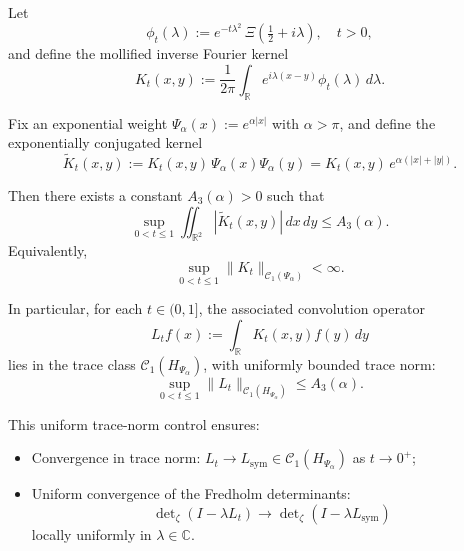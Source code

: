 \begin{lemma}
\label{lem:uniform_L1_conjugated_kernel}
Let
\[
\phi_t(\lambda) := e^{-t\lambda^2} \, \Xi\left( \tfrac{1}{2} + i\lambda \right), \quad t > 0,
\]
and define the mollified inverse Fourier kernel
\[
K_t(x,y) := \frac{1}{2\pi} \int_{\mathbb{R}} e^{i\lambda(x - y)} \phi_t(\lambda) \, d\lambda.
\]

Fix an exponential weight \( \Psi_\alpha(x) := e^{\alpha |x|} \) with \( \alpha > \pi \), and define the exponentially conjugated kernel
\[
\widetilde{K}_t(x,y) := K_t(x,y)\, \Psi_\alpha(x)\Psi_\alpha(y) = K_t(x,y)\, e^{\alpha(|x| + |y|)}.
\]

Then there exists a constant \( A_3(\alpha) > 0 \) such that
\[
\sup_{0 < t \le 1} \iint_{\mathbb{R}^2} |\widetilde{K}_t(x,y)| \, dx\,dy \le A_3(\alpha).
\]
Equivalently,
\[
\sup_{0 < t \le 1} \|K_t\|_{\mathcal{C}_1(\Psi_\alpha)} < \infty.
\]

In particular, for each \( t \in (0,1] \), the associated convolution operator
\[
L_t f(x) := \int_{\mathbb{R}} K_t(x,y) f(y)\, dy
\]
lies in the trace class \( \mathcal{C}_1(H_{\Psi_\alpha}) \), with uniformly bounded trace norm:
\[
\sup_{0 < t \le 1} \|L_t\|_{\mathcal{C}_1(H_{\Psi_\alpha})} \le A_3(\alpha).
\]

\noindent
This uniform trace-norm control ensures:
\begin{itemize}
    \item Convergence in trace norm: \( L_t \to L_{\mathrm{sym}} \in \mathcal{C}_1(H_{\Psi_\alpha}) \) as \( t \to 0^+ \);
    \item Uniform convergence of the Fredholm determinants:
    \[
    \det\nolimits_\zeta(I - \lambda L_t) \to \det\nolimits_\zeta(I - \lambda L_{\mathrm{sym}})
    \]
    locally uniformly in \( \lambda \in \mathbb{C} \).
\end{itemize}
\end{lemma}
